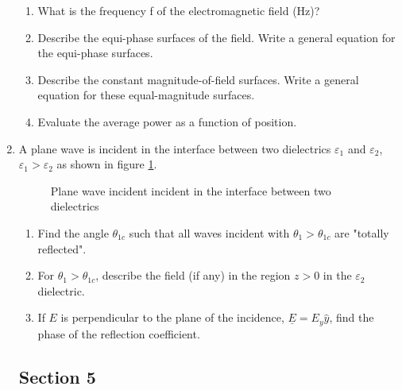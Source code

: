 \documentclass[main.tex]{subfiles}
\begin{document}
\begin{enumerate}
    \begin{enumerate}
        \item What is the frequency f of the electromagnetic field (Hz)?
        \item Describe the equi-phase surfaces of the field. Write a general equation for the equi-phase surfaces.
        \item Describe the constant magnitude-of-field surfaces. Write a general equation for these equal-magnitude surfaces.
        \item Evaluate the average power as a function of position.
    \end{enumerate}

\item A plane wave is incident in the interface between two dielectrics $\varepsilon_1$ and $\varepsilon_2$, $\varepsilon_1 > \varepsilon_2$ as shown in figure \ref{fig:12q_a}.

\begin{figure}
\centering{}
\caption{Plane wave incident incident in the interface between two dielectrics}
\label{fig:12q_a}
\end{figure}

    \begin{enumerate}
        \item Find the angle $\theta_{1c}$ such that all waves incident with $\theta_1 > \theta_{1c}$ are "totally reflected".
        \item For $\theta_1 > \theta_{1c}$, describe the field (if any) in the region $z > 0$ in the $\varepsilon_2$ dielectric.
        \item If \underline{$E$} is perpendicular to the plane of the incidence, $\underline{E} = E_y \hat{y}$, find the phase of the reflection coefficient.
    \end{enumerate}

\subsection{Section 5} 


\end{enumerate}
\end{document}
